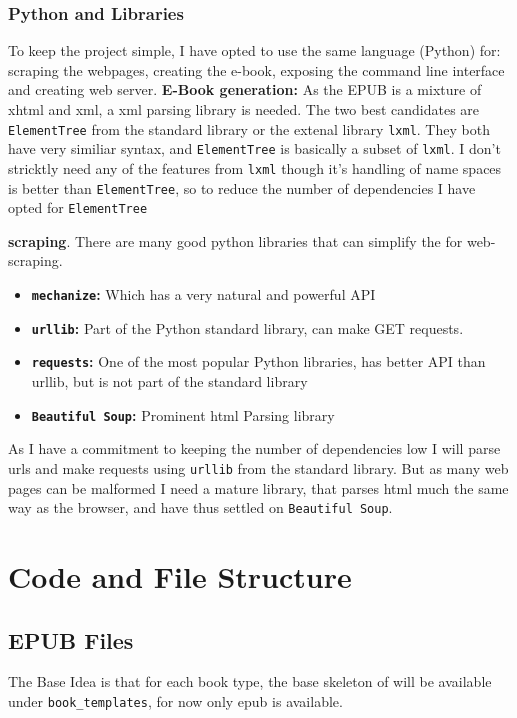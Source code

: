 \documentclass[]{report}   %
\begin{document}
\subsubsection{Python and Libraries}
To keep the project simple, I have opted to use the same language (Python) for:
scraping the webpages, creating the e-book, exposing the command line
interface and creating web server.
\textbf{E-Book generation:} As the EPUB is a mixture of xhtml and xml, a xml
parsing library is needed. The two best candidates are \texttt{ElementTree}
from the standard library or the extenal library \texttt{lxml}. They both have
very similiar syntax, and \texttt{ElementTree} is basically a subset of
\texttt{lxml}. I don't stricktly need any of the features from \texttt{lxml}
though it's handling of name spaces is better than \texttt{ElementTree}, so to
reduce the number of dependencies I have opted for \texttt{ElementTree}

\textbf{scraping}. There are many good python libraries that can simplify the for web-scraping.
\begin{itemize}
    \item \textbf{\texttt{mechanize}:} Which has a very natural and powerful API
    \item \textbf{\texttt{urllib}:} Part of the Python standard library, can make GET requests.
    \item \textbf{\texttt{requests}:} One of the most popular Python libraries,
        has better API than urllib, but is not part of the standard library
    \item \textbf{\texttt{Beautiful Soup}:} Prominent html Parsing library
\end{itemize}
As I have a commitment to keeping the number of dependencies low I will parse
urls and make requests using \texttt{urllib} from the standard library. But as
many web pages can be malformed I need a mature library, that parses html much
the same way as the browser, and have thus settled on \texttt{Beautiful Soup}.

\section{Code and File Structure}
\subsection{EPUB Files}
The Base Idea is that for each book type, the base skeleton of will be available
under \texttt{book\_templates}, for now only epub is available. 
\end{document}
